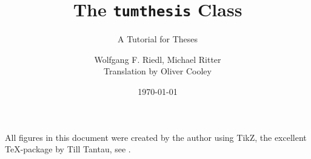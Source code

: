 \documentclass[]{tumthesis}
\author{Wolfgang F. Riedl, Michael Ritter\\Translation by Oliver Cooley}
\title{The \texttt{tumthesis} Class}
\subtitle{A Tutorial for Theses}
\institute{Department of Mathematics}
\date{\today} %
\begin{document}
\pagestyle{empty}
\frontmatter%
\maketitlepage%
\makedeclaration%


\tableofcontents%

\mainmatter%
\pagestyle{headings}




%
%
%

\appendix

%
\backmatter

\listoffigures

\vspace*{1.5cm}

All figures in this document were created by the author using TikZ, the excellent \TeX-package by Till Tantau, see \cite{Tantau2007}.



\listoftables





\printindex

\printbibliography[title={References},heading=bibnumbered]


%
\end{document}
